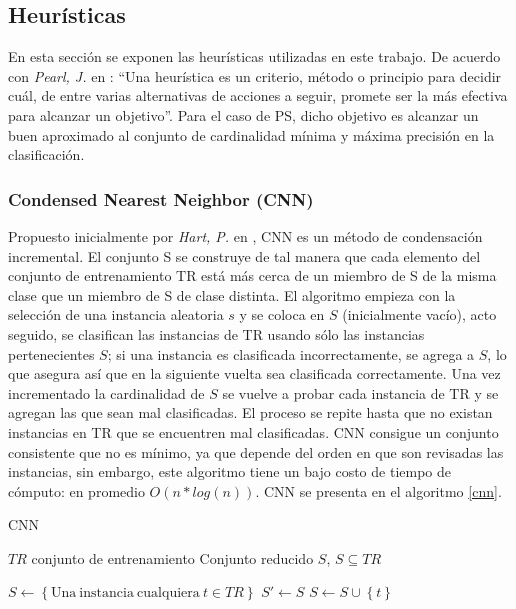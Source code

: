\subsection{Heurísticas}

En esta sección se exponen las heurísticas utilizadas en este trabajo. De acuerdo con \emph{Pearl, J.} en \cite{pearl1984heuristics}: ``Una heurística es un criterio, método o principio para decidir cuál, de entre varias alternativas de acciones a seguir, promete ser la más efectiva para alcanzar un objetivo''. Para el caso de PS, dicho objetivo es alcanzar un buen aproximado al conjunto de cardinalidad mínima y máxima precisión en la clasificación.

\subsubsection{Condensed Nearest Neighbor (CNN)}

Propuesto inicialmente por \emph{Hart, P.} en \cite{hart1968condensed}, CNN es un método de condensación incremental. El conjunto S se construye de tal manera que cada elemento del conjunto de entrenamiento TR está más cerca de un miembro de S de la misma clase que un miembro de S de clase distinta. El algoritmo empieza con la selección de una instancia aleatoria $s$ y se coloca en $S$ (inicialmente vacío), acto seguido, se clasifican las instancias de TR usando sólo las instancias pertenecientes $S$; si una instancia es clasificada incorrectamente, se agrega a $S$, lo que asegura así que en la siguiente vuelta sea clasificada correctamente. Una vez incrementado la cardinalidad de $S$ se vuelve a probar cada instancia de TR y se agregan las que sean mal clasificadas. El proceso se repite hasta que no existan instancias en TR que se encuentren mal clasificadas. CNN consigue un conjunto consistente que no es mínimo, ya que depende del orden en que son revisadas las instancias, sin embargo, este algoritmo tiene un bajo costo de tiempo de cómputo: en promedio $O(n*log(n))$. CNN se presenta en el algoritmo \ref{cnn}. 

\begin{algorithm}
\caption{CNN}
\label{cnn}
\begin{algorithmic}[1]

\Require $TR$ conjunto de entrenamiento
\Ensure Conjunto reducido $S$, $S \subseteq TR$

\State $S \gets \left\lbrace \mathrm{Una\ instancia\ cualquiera}\ t \in TR \right\rbrace$
\Repeat
	\State $S' \gets S$
			\State $S \gets S \cup \left\lbrace t \right\rbrace$
		\EndIf
	\EndFor
{}
\State {}
\end{algorithmic}
\end{algorithm}


